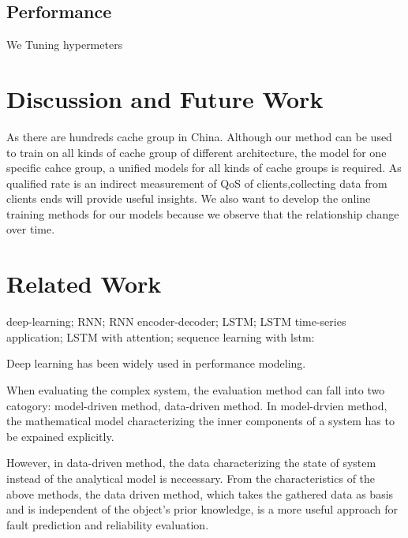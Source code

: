 \documentclass[5p]{elsarticle}
\begin{document}
\subsection{Performance}
We Tuning hypermeters

\section{Discussion and Future Work}
As there are hundreds cache group in China. Although our method can be used to train on all kinds of cache group of different architecture, the model for one specific cahce group, a unified models for all kinds of cache groups is required. As qualified rate is an indirect measurement of QoS of clients,collecting data from clients ends will provide useful insights. We also want to develop the online training methods for our models because we observe that the relationship change over time.


\section{Related Work}
deep-learning; RNN; RNN encoder-decoder; LSTM; LSTM time-series application; LSTM with attention; sequence learning with lstm:

Deep learning has been widely used in performance modeling. 

When evaluating the complex system, the evaluation method can fall into two catogory: model-driven method, data-driven method. In model-drvien method, the mathematical model characterizing the inner components of a system has to be expained explicitly. 

However, in data-driven method, the data characterizing the state of system instead of the analytical model is neceessary. From the characteristics of the above methods, the data driven method, which takes the gathered data as basis and is independent of the object’s prior knowledge, is a more useful approach for fault prediction and reliability evaluation.
\end{document}
